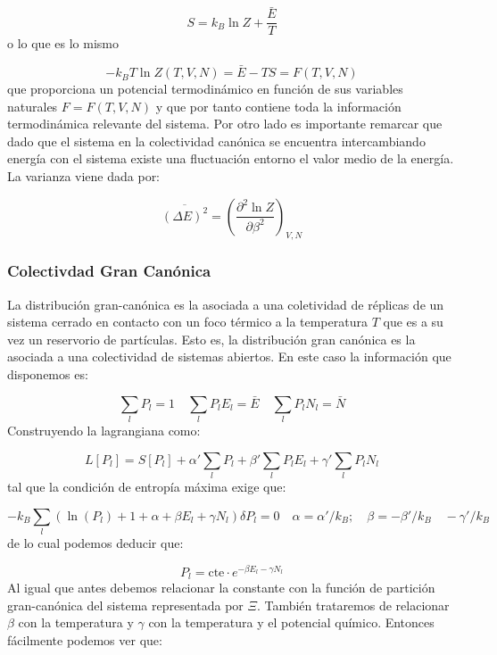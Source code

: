 \documentclass[12pt,a4paper]{article}
\numberwithin{equation}{section}
\numberwithin{figure}{section}
\newcommand{\parentesis}[1]{\left( #1  \right)}
\newcommand{\parciales}[2]{\frac{\partial #1}{\partial #2}}
\newcommand{\cte}{\mathrm{cte}}
\theoremstyle{definition}
\begin{document}
\begin{equation}
S = k_B \ln Z + \frac{\bar{E}}{T} \label{Ec:1.5.047}
\end{equation}
o lo que es lo mismo

\begin{equation}
- k_B T \ln Z (T,V,N) = \bar{E} - T S = F(T,V,N)
\end{equation}
que proporciona un potencial termodinámico en función de sus variables naturales $F=F(T,V,N)$ y que por tanto contiene toda la información termodinámica relevante del sistema. Por otro lado es importante remarcar que dado que el sistema en la colectividad canónica se encuentra intercambiando energía con el sistema existe una fluctuación entorno el valor medio de la energía. La varianza viene dada por:

\begin{equation}
\overline{(\Delta E)^2} = \parentesis{\parciales{^2 \ln Z}{\beta^2}}_{V,N}
\end{equation}

\subsubsection{Colectivdad Gran Canónica}
La distribución gran-canónica es la asociada a una coletividad de réplicas de un sistema cerrado en contacto con un foco térmico a la temperatura $T$ que es a su vez un reservorio de partículas. Esto es, la distribución gran canónica es la asociada a una colectividad de sistemas abiertos. En este caso la información que disponemos es:

\begin{equation}
\sum_l P_l = 1 \quad \sum_l P_l E_l = \bar{E} \quad \sum_l P_l N_l = \bar{N}
\end{equation}
Construyendo la lagrangiana como:

\begin{equation}
L[P_l] = S[P_l] + \alpha' \sum_l P_l + \beta ' \sum_l P_l E_l +
 \gamma ' \sum_l P_l N_l
\end{equation}
tal que la condición de entropía máxima exige que:

\begin{equation}
- k_B \sum_l \parentesis{\ln (P_l) + 1 + \alpha + \beta E_l + \gamma N_l} \delta P_l=0 \quad \alpha = \alpha'/k_B; \quad \beta = -\beta'/k_B \quad - \gamma' / k_B
\end{equation}
de lo cual podemos deducir que:

\begin{equation}
P_l = \cte \cdot e^{-\beta E_l - \gamma N_l}
\end{equation}
Al igual que antes debemos relacionar la constante con la función de partición gran-canónica del sistema representada por $\Xi$. También trataremos de relacionar $\beta$ con la temperatura y $\gamma$ con la temperatura y el potencial químico. Entonces fácilmente podemos ver que:
\end{document}
